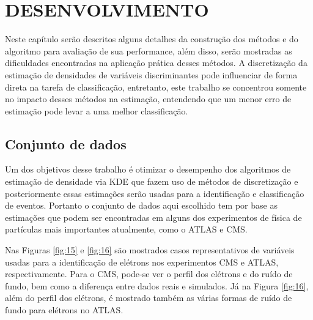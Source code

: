 \chapter{DESENVOLVIMENTO} \label{cap:desenvolvimento}
\vspace{-2cm}
Neste capítulo serão descritos alguns detalhes da construção dos métodos e do algoritmo para avaliação de sua performance, além disso, serão mostradas as dificuldades encontradas na aplicação prática desses métodos. A discretização da estimação de densidades de variáveis discriminantes pode influenciar de forma direta na tarefa de classificação, entretanto, este trabalho se concentrou somente no impacto desses métodos na estimação, entendendo que um menor erro de estimação pode levar a uma melhor classificação.

\section{Conjunto de dados}

Um dos objetivos desse trabalho é otimizar o desempenho dos algoritmos de estimação de densidade via KDE que fazem uso de métodos de discretização e posteriormente essas estimações serão usadas para a identificação e classificação de eventos. Portanto o conjunto de dados aqui escolhido tem por base as estimações que podem ser encontradas em alguns dos experimentos de física de partículas mais importantes atualmente, como o ATLAS e CMS.

Nas Figuras \ref{fig:15} e \ref{fig:16} são mostrados casos representativos de variáveis usadas para a identificação de elétrons nos experimentos CMS e ATLAS, respectivamente. Para o CMS, pode-se ver o perfil dos elétrons e do ruído de fundo, bem como a diferença entre dados reais e simulados. Já na Figura \ref{fig:16}, além do perfil dos elétrons, é mostrado também as várias formas de ruído de fundo para elétrons no ATLAS.


